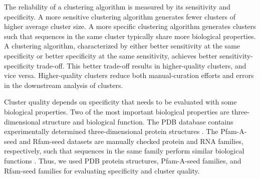 \documentclass[11pt,letterpaper]{article}
\begin{document}
The reliability of a clustering algorithm is measured by its sensitivity and specificity.
A more sensitive clustering algorithm generates fewer clusters of higher average cluster size.
A more specific clustering algorithm generates clusters such that sequences in the same cluster typically share more biological properties.
A clustering algorithm, characterized by either better sensitivity at the same specificity or better specificity at the same sensitivity, achieves better sensitivity-specificity trade-off.
This better trade-off results in higher-quality clusters, and vice versa.
Higher-quality clusters reduce both manual-curation efforts and errors in the downstream analysis of clusters.

Cluster quality depends on specificity that needs to be evaluated with some biological properties.
Two of the most important biological properties are three-dimensional structure and biological function.
The PDB database contains experimentally determined three-dimensional protein structures \cite{berman2006protein}.
The Pfam-A-seed and Rfam-seed datasets are manually checked protein and RNA families, respectively, such that sequences in the same family perform similar biological functions \citep{finn2016pfam,nawrocki2014rfam}.
Thus, we used PDB protein structures, Pfam-A-seed families, and Rfam-seed families for evaluating specificity and cluster quality.
\end{document}
